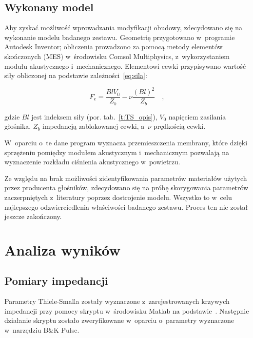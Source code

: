 \documentclass[12pt]{oska}
\begin{document}
	\subsection{Wykonany model}
	
	Aby zyskać możliwość wprowadzania modyfikacji obudowy, zdecydowano się na wykonanie modelu badanego zestawu. Geometrię przygotowano w~programie Autodesk Inventor; obliczenia prowadzono za pomocą metody elementów skończonych (MES) w~środowisku Comsol Multiphysics, z~wykorzystaniem modułu akustycznego i~mechanicznego. Elementowi cewki przypisywano wartość siły obliczonej na podstawie zależności~\eqref{eq:sila}:
	
	\begin{equation}
	F_e=\frac{BlV_0}{Z_b}-\nu\frac{(Bl)^2}{Z_b} \quad, \label{eq:sila}
	\end{equation}
	
	\noindent gdzie $Bl$ jest indeksem siły (por. tab.~\ref{t:TS_opis}), $V_0$ napięciem zasilania głośnika, $Z_b$ impedancją zablokowanej cewki, a~$\nu$ prędkością cewki. 
	
	W~oparciu o~te dane program wyznacza przemieszczenia membrany, które dzięki sprzężeniu pomiędzy modułem akustycznym i~mechanicznym pozwalają na wyznaczenie rozkładu ciśnienia akustycznego w~powietrzu.
	
	Ze względu na brak możliwości zidentyfikowania parametrów materiałów użytych przez producenta głośników, zdecydowano się na próbę skorygowania parametrów zaczerpniętych z~literatury \cite{modelowanie} poprzez dostrojenie modelu. Wszystko to w~celu najlepszego odzwierciedlenia właściwości badanego zestawu. Proces ten nie został jeszcze zakończony.
	
	
	\section{Analiza wyników}
	
	\subsection{Pomiary impedancji}
	
	Parametry Thiele-Smalla zostały wyznaczone z~zarejestrowanych krzywych impedancji przy pomocy skryptu w~środowisku Matlab na podstawie~\cite{dobrucki}. Następnie działanie skryptu zostało zweryfikowane w~oparciu o~parametry wyznaczone w~narzędziu B\&K Pulse. 
	
\end{document}

